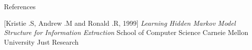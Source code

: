 \documentclass{beamer}
\begin{document}
\begin{frame}{References}
\begin{thebibliography}{10}
 [Kristie .S, Andrew .M and Ronald .R, 1999]
    \newblock \emph{Learning Hidden Markov Model Structure for Information Extraction}
    \newblock School of Computer Science Carneie Mellon University
    \newblock Just Research
\end{thebibliography}
\end{frame}
\end{document}
